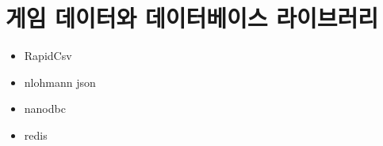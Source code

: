 \chapter{게임 데이터와 데이터베이스 라이브러리}

\begin{itemize}
    \item RapidCsv
    \item nlohmann json 
    \item nanodbc
    \item redis 
\end{itemize}


